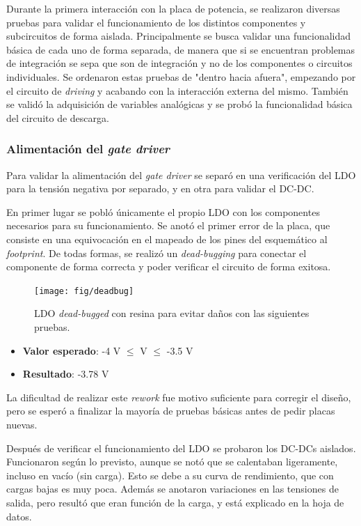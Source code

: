 Durante la primera interacción con la placa de potencia, se realizaron diversas pruebas para validar el funcionamiento de los distintos componentes y subcircuitos de forma aislada. Principalmente se busca validar una funcionalidad básica de cada uno de forma separada, de manera que si se encuentran problemas de integración se sepa que son de integración y no de los componentes o circuitos individuales. Se ordenaron estas pruebas de "dentro hacia afuera", empezando por el circuito de \textit{driving} y acabando con la interacción externa del mismo. También se validó la adquisición de variables analógicas y se probó la funcionalidad básica del circuito de descarga.


\subsubsection{Alimentación del \textit{gate driver}}

Para validar la alimentación del \textit{gate driver} se separó en una verificación del LDO para la tensión negativa por separado, y en otra para validar el DC-DC.

En primer lugar se pobló únicamente el propio LDO con los componentes necesarios para su funcionamiento. Se anotó el primer error de la placa, que consiste en una equivocación en el mapeado de los pines del esquemático al \textit{footprint}. De todas formas, se realizó un \textit{dead-bugging} para conectar el componente de forma correcta y poder verificar el circuito de forma exitosa.

\begin{figure}[H]
	\centering
	\texttt{[image: fig/deadbug]}
	\caption{LDO \textit{dead-bugged} con resina para evitar daños con las siguientes pruebas.}
\end{figure}

\begin{itemize}
	\item \textbf{Valor esperado}: -4 V $\le$ V $\le$ -3.5 V
	\item \textbf{Resultado}: -3.78 V
\end{itemize}


La dificultad de realizar este \textit{rework} fue motivo suficiente para corregir el diseño, pero se esperó a finalizar la mayoría de pruebas básicas antes de pedir placas nuevas.

Después de verificar el funcionamiento del LDO se probaron los DC-DCs aislados. Funcionaron según lo previsto, aunque se notó que se calentaban ligeramente, incluso en vacío (sin carga). Esto se debe a su curva de rendimiento, que con cargas bajas es muy poca. Además se anotaron variaciones en las tensiones de salida, pero resultó que eran función de la carga, y está explicado en la hoja de datos.


